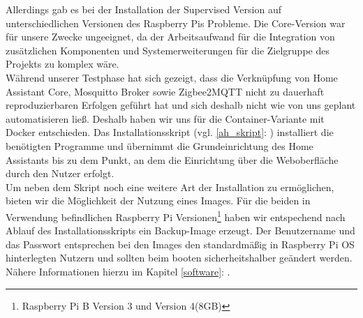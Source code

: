 \noindent Allerdings gab es bei der Installation der Supervised Version auf unterschiedlichen Versionen des Raspberry Pis Probleme.
Die Core-Version war für unsere Zwecke ungeeignet, da der Arbeitsaufwand für die Integration von zusätzlichen Komponenten und Systemerweiterungen für die Zielgruppe des Projekts zu komplex wäre. \\
\noindent Während unserer Testphase hat sich gezeigt, dass die Verknüpfung von Home Assistant Core, Mosquitto Broker sowie Zigbee2MQTT nicht zu dauerhaft reproduzierbaren Erfolgen geführt hat und sich deshalb nicht wie von uns geplant automatisieren ließ. 
Deshalb haben wir uns für die Container-Variante mit Docker entschieden. 
Das Installationsskript (vgl. \ref{ah_skript}: ) installiert die benötigten Programme und übernimmt die Grundeinrichtung des Home Assistants bis zu dem Punkt, an dem die Einrichtung über die Weboberfläche durch den Nutzer erfolgt.\\
\noindent Um neben dem Skript noch eine weitere Art der Installation zu ermöglichen, bieten wir die Möglichkeit der Nutzung eines Images.
Für die beiden in Verwendung befindlichen Raspberry Pi Versionen\footnote{Raspberry Pi B Version 3 und Version 4(8GB)} haben wir entspechend nach Ablauf des Installationsskripts ein Backup-Image erzeugt.
Der Benutzername und das Passwort entsprechen bei den Images den standardmäßig in Raspberry Pi OS hinterlegten Nutzern und sollten beim booten sicherheitshalber geändert werden.\\
\noindent Nähere Informationen hierzu im Kapitel \ref{software}: .